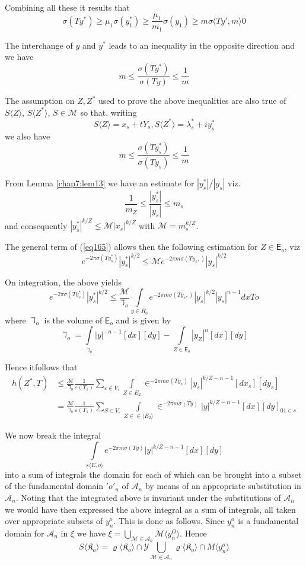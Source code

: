 Combining all these it results that
$$
\sigma (Ty^*) \ge \mu_1 \sigma (y^*_1) \ge \frac{\mu_1}{m_1} \sigma
(y_1) \ge m \sigma (Ty' , m \rangle 0 
$$

The interchange of $y$ and $y^*$ leads to an inequality in the
opposite direction and we have 
$$
m \le \frac{\sigma(Ty^*)}{\sigma (T y)} \le \frac{1}{m}
$$

The assumption on $Z, Z^*$ used to prove the above inequalities are
also true of  $S\langle Z\rangle$, $S\langle Z^*\rangle$,  $S \in
\mathscr{M}$ so that, writing 
$$
S\langle Z\rangle = x_s + tY_s , S\langle Z^*\rangle = \lambda^*_s + i
y^*_s 
$$
we also have
$$
m \le \frac{\sigma(Ty^*_s)}{\sigma (T y_s)} \le \frac{1}{m}  
$$

From Lemma \ref{chap7:lem13} we have an estimate for $|y^*_s|/|y_s|$ viz.
$$
\frac{1}{m_Z} \le \frac{|y^*_s|}{|y_s|} \le m_s
$$
and consequently $|y_s^*|^{k/Z}\le \mathscr{M}|x_s|^{k/Z}$ with
$\mathscr{M}= m_s^{k/Z}$. 

The general term of (\ref{eq165}) allows then the following estimation for
$Z \in \mathsf{E}_o$, viz 
$$
e^{-2\pi \sigma(Ty^*_s)} |y^*_s|^{k/2} \le \mathscr{M} e^{-2 \pi m
  \sigma (Ty_s,)} |y_s|^{k/2} 
$$

On integration, the above yields
$$
e^{-2\pi \sigma(Ty^*_s)} |y^*_s|^{k/2} \le \frac{\mathscr{M}}
{\daleth_o} \int\limits_{y \in R_o} e^{-2 \pi m \sigma (Ty_s,)} |y_s|^{k/2}
|y_s|^{n-1} dx To 
$$
where $\daleth_o$ is the volume of $\mathsf{E}_o$ and is given by 
$$
\daleth_o = \int\limits_{\daleth_o} |y|^{-n-1} [d x][dy] - \int\limits_{Z \in
  \mathsf{E}_o} |y_Z|^{n} [dx][dy] 
$$

Hence it\pageoriginale  follows that
\begin{align*}
h(Z^*, T) & \le \frac{\mathscr{M}}{\daleth_o} \frac{1}{\varepsilon
  (T_1)} \sum_{\varepsilon \in V_r} \int\limits_{Z \in E_2} \in^{-2 \pi m
  \sigma (T y_s)} |y_s|^{k/Z - n- 1}[dx_s][dy_s]\\ 
& =\frac{\mathscr{M}}{\daleth_o} \frac{1}{\varepsilon (T_1)} \sum_{ S
  \in V_r} \int\limits_{Z \in \in \langle E_2 \rangle } \in^{-2 \pi m \sigma
  (T y)} |y|^{k/Z - n- 1}[dx][dy]_{01 \in s}\tag{166}\label{eq166} 
\end{align*}

We now break the integral
$$
\int\limits_{s \langle E, o\rangle} e^{-2 \pi m \sigma (T y)} |y|^{k/Z - n-
  1}[dx][dy] 
$$
into a sum of integrals the domain for each of which can be brought
into a subset of the fundamental domain $'o'_n$ of $\mathscr{A}_n$ by
means of an appropriate substitution in $\mathscr{A}_n$. Noting that
the integrated above is invariant under the substitutions of
$\mathscr{A}_n$ we would have then expressed the above integral as a
sum of integrals, all taken over appropriate subsets of
$y_n^o$. This is done as follows. Since $y_n^o$ is a
fundamental domain for $\mathscr{A}_n$ in $\xi$ we have $\xi =
\bigcup\limits_{\mathscr{M} \in \mathscr{A}_n} \mathscr{M}
\langle y_n^O\rangle$. Hence 
$$
S\langle\mathfrak{K}_o\rangle = \varrho \langle\mathfrak{K}_o\rangle
\cap \mathscr{Y} \bigcup_{\mathscr{M} \in \mathscr{A}_n} \varrho
\langle\mathfrak{K}_o\rangle \cap M \langle y^o_n\rangle 
$$

